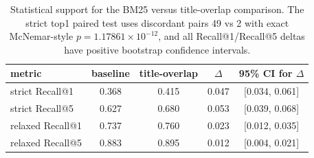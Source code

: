 \begin{table}[t]
\centering
\caption{Statistical support for the BM25 versus title-overlap comparison. The strict top1 paired test uses discordant pairs 49 vs 2 with exact McNemar-style $p=1.17861\times10^{-12}$, and all Recall@1/Recall@5 deltas have positive bootstrap confidence intervals.}
\begin{tabular}{lcccc}
\hline
metric & baseline & title-overlap & $\Delta$ & 95\% CI for $\Delta$ \\
\hline
strict Recall@1 & 0.368 & 0.415 & 0.047 & [0.034, 0.061] \\
strict Recall@5 & 0.627 & 0.680 & 0.053 & [0.039, 0.068] \\
relaxed Recall@1 & 0.737 & 0.760 & 0.023 & [0.012, 0.035] \\
relaxed Recall@5 & 0.883 & 0.895 & 0.012 & [0.004, 0.021] \\
\hline
\end{tabular}
\end{table}
